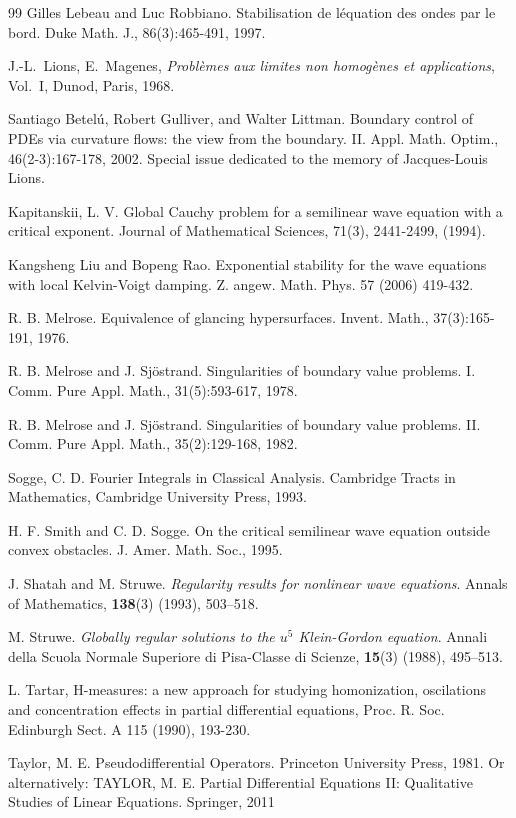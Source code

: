 \documentclass[11pt,letterpaper]{amsart}
\begin{document}
\begin{thebibliography}{99}
 Gilles Lebeau and Luc Robbiano. Stabilisation de l\'equation des ondes
par le bord. Duke Math. J., 86(3):465-491, 1997.

 J.-L.~Lions, E.~Magenes, \emph{Probl\`emes aux limites non homog\`enes et
applications}, Vol.~I, Dunod, Paris, 1968.


 Santiago Betel\'u, Robert Gulliver, and Walter Littman. Boundary control of PDEs via curvature flows:
the view from the boundary. II. Appl. Math. Optim., 46(2-3):167-178, 2002. Special issue dedicated to
the memory of Jacques-Louis Lions.

Kapitanskii, L. V.  Global Cauchy problem for a semilinear wave equation with a critical exponent. Journal of Mathematical Sciences, 71(3), 2441-2499, (1994).

 Kangsheng Liu and Bopeng Rao. Exponential stability for the wave equations with local
Kelvin-Voigt damping. Z. angew. Math. Phys. 57 (2006) 419-432.

 R. B. Melrose. Equivalence of glancing hypersurfaces. Invent. Math.,
37(3):165-191, 1976.


 R. B. Melrose and J. Sj\"ostrand. Singularities of boundary value problems.
I. Comm. Pure Appl. Math., 31(5):593-617, 1978.

R. B. Melrose and J. Sj\"ostrand. Singularities of boundary value problems.
II. Comm. Pure Appl. Math., 35(2):129-168, 1982.

 Sogge, C. D. Fourier Integrals in Classical Analysis. Cambridge Tracts in Mathematics, Cambridge University Press, 1993.


 H. F. Smith and C. D. Sogge. On the critical semilinear wave equation outside convex obstacles. J. Amer. Math. Soc., 1995.

J. Shatah and M. Struwe.
\newblock \emph{Regularity results for nonlinear wave equations}.
\newblock Annals of Mathematics, \textbf{138}(3) (1993), 503--518.

M. Struwe.
\newblock \emph{Globally regular solutions to the $u^5$ Klein-Gordon equation}.
\newblock Annali della Scuola Normale Superiore di Pisa-Classe di Scienze, \textbf{15}(3) (1988), 495--513.



 L. Tartar, H-measures: a new approach for studying homonization, oscilations and concentration effects in partial differential
                            equations, Proc. R. Soc. Edinburgh Sect. A 115 (1990), 193-230.

 Taylor, M. E. Pseudodifferential Operators. Princeton University Press, 1981.
Or alternatively: TAYLOR, M. E. Partial Differential Equations II: Qualitative Studies of Linear Equations. Springer, 2011


\end{thebibliography}
\end{document}
